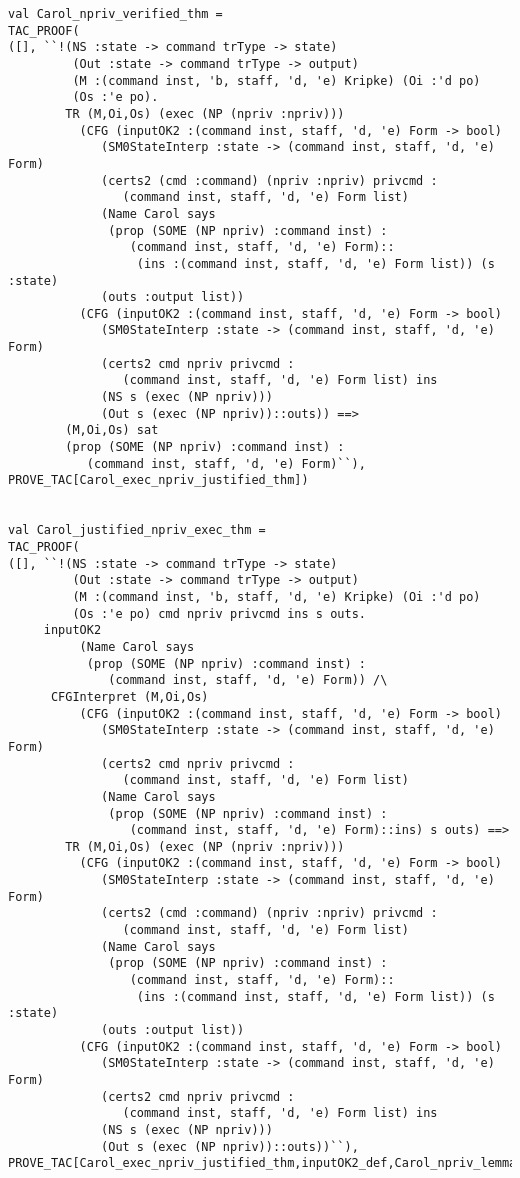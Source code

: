 \documentclass{article}
\begin{document}
\begin{verbatim}
val Carol_npriv_verified_thm =
TAC_PROOF(
([], ``!(NS :state -> command trType -> state)
         (Out :state -> command trType -> output)
         (M :(command inst, 'b, staff, 'd, 'e) Kripke) (Oi :'d po)
         (Os :'e po).
        TR (M,Oi,Os) (exec (NP (npriv :npriv)))
          (CFG (inputOK2 :(command inst, staff, 'd, 'e) Form -> bool)
             (SM0StateInterp :state -> (command inst, staff, 'd, 'e) Form)
             (certs2 (cmd :command) (npriv :npriv) privcmd :
                (command inst, staff, 'd, 'e) Form list)
             (Name Carol says
              (prop (SOME (NP npriv) :command inst) :
                 (command inst, staff, 'd, 'e) Form)::
                  (ins :(command inst, staff, 'd, 'e) Form list)) (s :state)
             (outs :output list))
          (CFG (inputOK2 :(command inst, staff, 'd, 'e) Form -> bool)
             (SM0StateInterp :state -> (command inst, staff, 'd, 'e) Form)
             (certs2 cmd npriv privcmd :
                (command inst, staff, 'd, 'e) Form list) ins
             (NS s (exec (NP npriv)))
             (Out s (exec (NP npriv))::outs)) ==>
        (M,Oi,Os) sat
        (prop (SOME (NP npriv) :command inst) :
           (command inst, staff, 'd, 'e) Form)``),
PROVE_TAC[Carol_exec_npriv_justified_thm])


val Carol_justified_npriv_exec_thm =
TAC_PROOF(
([], ``!(NS :state -> command trType -> state)
         (Out :state -> command trType -> output)
         (M :(command inst, 'b, staff, 'd, 'e) Kripke) (Oi :'d po)
         (Os :'e po) cmd npriv privcmd ins s outs.
	 inputOK2
          (Name Carol says
           (prop (SOME (NP npriv) :command inst) :
              (command inst, staff, 'd, 'e) Form)) /\
	  CFGInterpret (M,Oi,Os)
          (CFG (inputOK2 :(command inst, staff, 'd, 'e) Form -> bool)
             (SM0StateInterp :state -> (command inst, staff, 'd, 'e) Form)
             (certs2 cmd npriv privcmd :
                (command inst, staff, 'd, 'e) Form list)
             (Name Carol says
              (prop (SOME (NP npriv) :command inst) :
                 (command inst, staff, 'd, 'e) Form)::ins) s outs) ==>
        TR (M,Oi,Os) (exec (NP (npriv :npriv)))
          (CFG (inputOK2 :(command inst, staff, 'd, 'e) Form -> bool)
             (SM0StateInterp :state -> (command inst, staff, 'd, 'e) Form)
             (certs2 (cmd :command) (npriv :npriv) privcmd :
                (command inst, staff, 'd, 'e) Form list)
             (Name Carol says
              (prop (SOME (NP npriv) :command inst) :
                 (command inst, staff, 'd, 'e) Form)::
                  (ins :(command inst, staff, 'd, 'e) Form list)) (s :state)
             (outs :output list))
          (CFG (inputOK2 :(command inst, staff, 'd, 'e) Form -> bool)
             (SM0StateInterp :state -> (command inst, staff, 'd, 'e) Form)
             (certs2 cmd npriv privcmd :
                (command inst, staff, 'd, 'e) Form list) ins
             (NS s (exec (NP npriv)))
             (Out s (exec (NP npriv))::outs))``),
PROVE_TAC[Carol_exec_npriv_justified_thm,inputOK2_def,Carol_npriv_lemma])

\end{verbatim}
\end{document}
